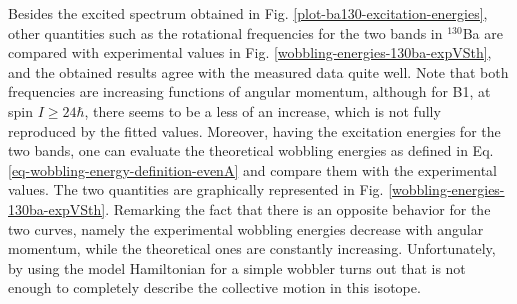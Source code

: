 Besides the excited spectrum obtained in Fig. \ref{plot-ba130-excitation-energies}, other quantities such as the rotational frequencies for the two bands in $^{130}$Ba are compared with experimental values in Fig. \ref{wobbling-energies-130ba-expVSth}, and the obtained results agree with the measured data quite well. Note that both frequencies are increasing functions of angular momentum, although for B1, at spin $I\geq 24\hbar$, there seems to be a less of an increase, which is not fully reproduced by the fitted values. Moreover, having the excitation energies for the two bands, one can evaluate the theoretical wobbling energies as defined in Eq. \ref{eq-wobbling-energy-definition-evenA} and compare them with the experimental values. The two quantities are graphically represented in Fig. \ref{wobbling-energies-130ba-expVSth}. Remarking the fact that there is an opposite behavior for the two curves, namely the experimental wobbling energies decrease with angular momentum, while the theoretical ones are constantly increasing. Unfortunately, by using the model Hamiltonian for a simple wobbler turns out that is not enough to completely describe the collective motion in this isotope.

